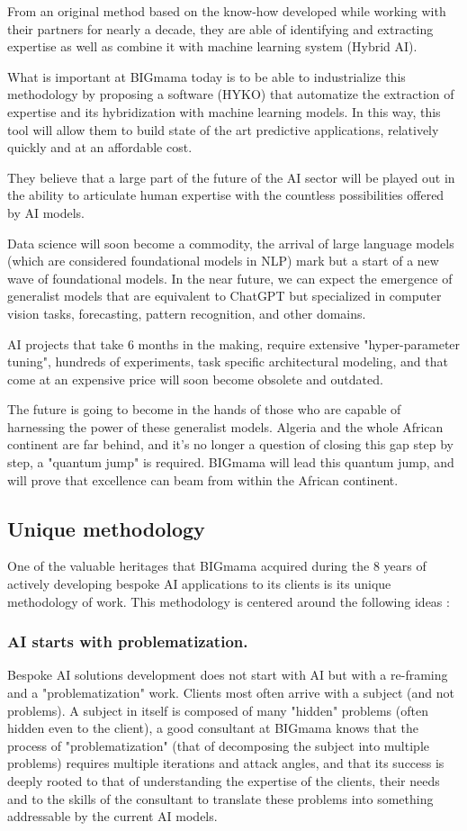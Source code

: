 \documentclass[a4paper,12pt]{article}
\begin{document}
From an original method based on the know-how developed while working with their partners for nearly a decade, 
they are able of identifying and extracting expertise as well as combine it with machine learning system (Hybrid AI).

What is important at BIGmama today is to be able to industrialize this methodology by proposing a software (HYKO) that automatize the extraction of expertise and 
its hybridization with machine learning models. In this way, this tool will allow them to build state of the art predictive applications, relatively quickly and at an affordable cost.

They believe that a large part of the future of the AI sector will be played out in the ability to articulate human expertise with the countless possibilities offered by AI models.

Data science will soon become a commodity, the arrival of large language models (which are considered foundational models in NLP) mark but a start of a new wave of foundational models. In the near future, we can expect the emergence of generalist models that are equivalent to ChatGPT but specialized in computer vision tasks, forecasting, pattern recognition, and other domains.

AI projects that take 6 months in the making, require extensive "hyper-parameter tuning", hundreds of experiments, task specific architectural modeling, and that come at an expensive price will soon become obsolete and outdated.

The future is going to become in the hands of those who are capable of harnessing the power of these generalist models. Algeria and the whole African continent are far behind, and it's no longer a question of closing this gap step by step, a "quantum jump" is required. BIGmama will lead this quantum jump, and will prove that excellence can beam from within the African continent. 

\subsection{Unique methodology}
One of the valuable heritages that BIGmama acquired during the 8 years of actively developing bespoke AI applications to its clients is its unique methodology of work. 
This methodology is centered around the following ideas : 

\subsubsection{AI starts with problematization.}
Bespoke AI solutions development does not start with AI but with a re-framing and a "problematization" work. 
Clients most often arrive with a subject (and not problems). A subject in itself is composed of many "hidden" problems (often hidden even to the client), 
a good consultant at BIGmama knows that the process of "problematization" (that of decomposing the subject into multiple problems) requires multiple iterations and attack angles, 
and that its success is deeply rooted to that of understanding the expertise of the clients, their needs and to the skills of the consultant to translate these problems into something addressable 
by the current AI models.
\end{document}
